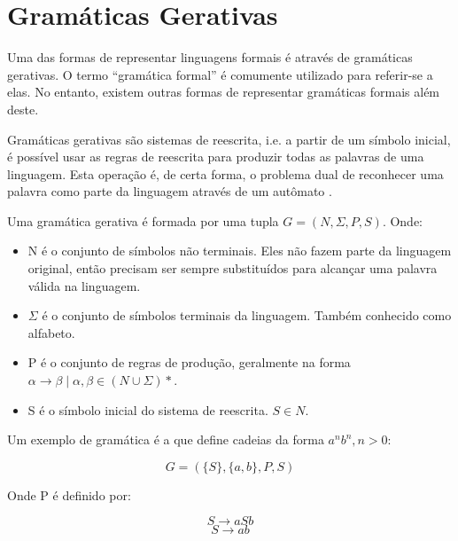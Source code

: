 \documentclass[a4paper,12pt,oneside,onecolumn]{uerj}
\begin{document}
\section{Gramáticas Gerativas}

Uma das formas de representar linguagens formais é através de gramáticas gerativas. O termo ``gramática formal'' é comumente utilizado para referir-se a elas. No entanto, existem outras formas de representar gramáticas formais além deste.

Gramáticas gerativas são sistemas de reescrita, i.e. a partir de um símbolo inicial, é possível usar as regras de reescrita para produzir todas as palavras de uma linguagem. Esta operação é, de certa forma, o problema dual de reconhecer uma palavra como parte da linguagem através de um autômato \cite{bib:Ruohonen09}.

Uma gramática gerativa é formada por uma tupla $G = (N, \Sigma, P, S)$. Onde:

\begin{itemize}
    \item N é o conjunto de símbolos não terminais. Eles não fazem parte da linguagem original, então precisam ser sempre substituídos para alcançar uma palavra válida na linguagem.
    \item $\Sigma$ é o conjunto de símbolos terminais da linguagem. Também conhecido como alfabeto.
    \item P é o conjunto de regras de produção, geralmente na forma $\alpha \rightarrow \beta \mid \alpha, \beta \in (N \cup \Sigma)*$.
    \item S é o símbolo inicial do sistema de reescrita. $S \in N$.
\end{itemize}

Um exemplo de gramática é a que define cadeias da forma $a^nb^n, n>0$:

\begin{equation*}
	G = ({\{S\}, \{a,b\}, P, S})
\end{equation*}

Onde P é definido por:

\begin{equation*}
	S \rightarrow aSb
\end{equation*}
\begin{equation*}
	S \rightarrow ab
\end{equation*}
\end{document}
